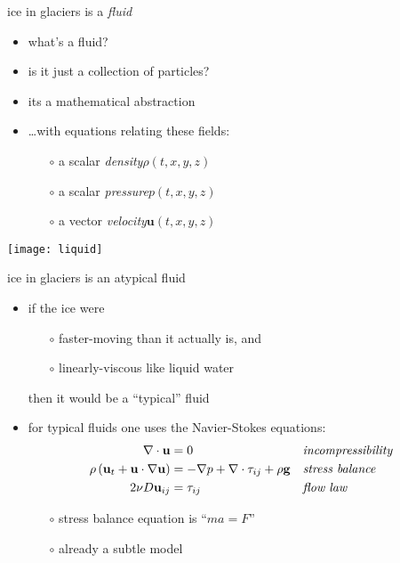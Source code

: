 \begin{frame}{ice in glaciers is a \emph{fluid}}

\begin{itemize}
\item what's a fluid?
\item is it just a collection of particles?

\medskip
\item<2-3> its a mathematical abstraction

\medskip
\item<3> \dots with equations relating these fields:
  \begin{itemize}
  \item[$\circ$] a scalar \emph{density}\quad $\rho(t,x,y,z)$
  \item[$\circ$] a scalar \emph{pressure}\quad $p(t,x,y,z)$
  \item[$\circ$] a vector \emph{velocity}\quad $\mathbf{u}(t,x,y,z)$
  \end{itemize}
\end{itemize}

\vspace{-2mm}
\texttt{[image: liquid]} \hfill {} \hfill
{}
\end{frame}


\begin{frame}{ice in glaciers is an atypical fluid}

\begin{itemize}
\item if the ice were
  \begin{itemize}
  \item[$\circ$] faster-moving than it actually is, and
  \item[$\circ$] linearly-viscous like liquid water
  \end{itemize}
  
  then it would be a ``typical'' fluid

\bigskip
\item for typical fluids one uses the Navier-Stokes equations:
\begin{align*}
\nabla \cdot \mathbf{u} &= 0 &&\text{\emph{incompressibility}} \\
\rho \left(\mathbf{u}_t + \mathbf{u}\cdot\nabla \mathbf{u}\right) &= -\nabla p + \nabla \cdot \tau_{ij} + \rho \mathbf{g} &&\text{\emph{stress balance}} \\
2 \nu D\mathbf{u}_{ij} &= \tau_{ij} &&\text{\emph{flow law}}
\end{align*}

\medskip
    \begin{itemize}
    \item[$\circ$] stress balance equation is ``$m a = F$''
    \item[$\circ$] already a subtle model
    \end{itemize}
\end{itemize}
\end{frame}


